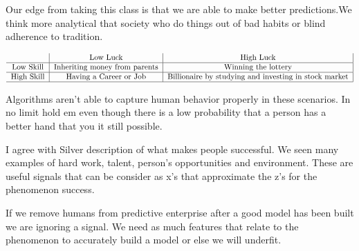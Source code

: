 \documentclass[12pt]{article}
\begin{document}
\begin{enumerate}

Our edge from taking this class is that we are able to make better predictions.We think more analytical that society who do things out of bad habits or blind adherence to tradition. 


\begin{align*}
    \begin{tabular}{ c |c| c|}
  & Low Luck & High Luck \\ 
  \hline
 Low Skill & Inheriting money from parents & Winning the lottery\\  
 \hline
 High Skill & Having a Career or Job &  Billionaire by studying and investing in stock market \\
 \hline
\end{tabular}
\end{align*}



Algorithms aren't able to capture human behavior properly in these scenarios. In no limit hold em even though there is a low probability that a person has a better hand that you it still possible.  


I agree with Silver description of what makes people successful. We seen many examples of hard work, talent, person's opportunities and environment. These are useful signals that can be consider as x's that approximate the z's for the phenomenon success.  


If we remove humans from predictive enterprise after a good model has been built we are ignoring a signal. We need as much features that relate to the phenomenon to accurately build a model or else we will underfit. 


\end{enumerate}
\end{document}
